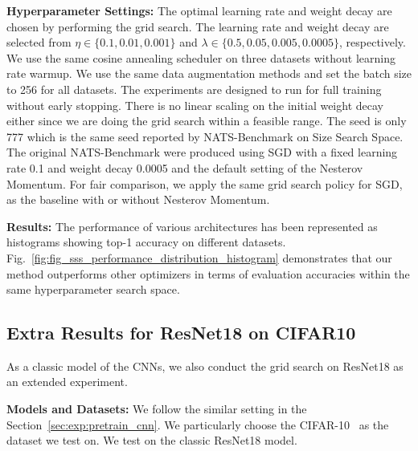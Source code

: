 \textbf{Hyperparameter Settings:} The optimal learning rate and weight decay are chosen by performing the grid search. The learning rate and weight decay are selected from $\eta \in \{0.1, 0.01, 0.001\}$ and $\lambda \in \{0.5, 0.05, 0.005, 0.0005\}$, respectively. We use the same cosine annealing scheduler on three datasets without learning rate warmup. We use the same data augmentation methods and set the batch size to 256 for all datasets. The experiments are designed to run for full training without early stopping. There is no linear scaling on the initial weight decay either since we are doing the grid search within a feasible range. The seed is only {777} which is the same seed reported by NATS-Benchmark on Size Search Space. The original NATS-Benchmark were produced using SGD with a fixed learning rate 0.1 and weight decay 0.0005 and the default setting of the Nesterov Momentum. For fair comparison, we apply the same grid search policy for SGD, as the baseline with or without Nesterov Momentum. 

\textbf{Results:} The performance of various architectures has been represented as histograms showing top-1 accuracy on different datasets. Fig.~\ref{fig:fig_sss_performance_distribution_histogram} demonstrates that our method outperforms other optimizers in terms of evaluation accuracies within the same hyperparameter search space.


\subsection{Extra Results for ResNet18 on CIFAR10}


As a classic model of the CNNs, we also conduct the grid search on ResNet18 as an extended experiment. 

\textbf{Models and Datasets:} We follow the similar setting in the Section~\ref{sec:exp:pretrain_cnn}. We particularly choose the CIFAR-10~\cite{krizhevsky2009learning} as the dataset we test on. We test on the classic ResNet18 model.

